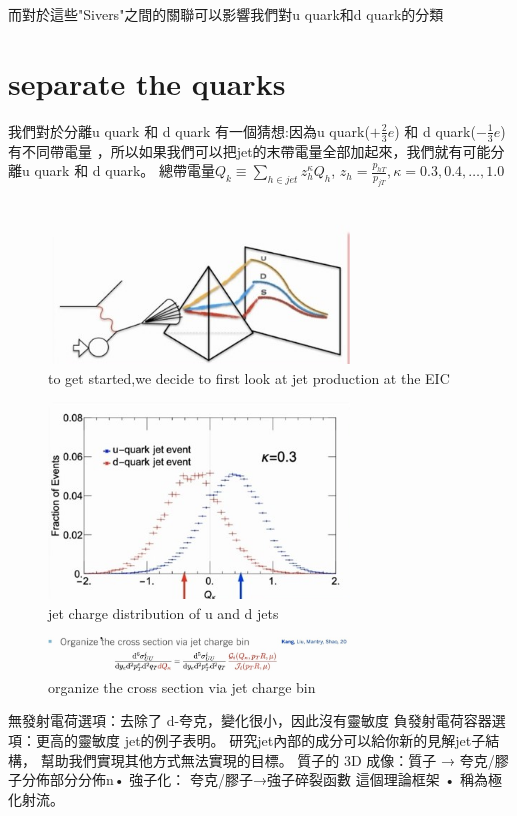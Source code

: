 \documentclass[12pt, a4paper, oneside]{ctexart}
\begin{document}
\begin{spacing}{2.0}
而對於這些"Sivers"之間的關聯可以影響我們對u quark和d quark的分類

\section{separate the quarks}

我們對於分離u quark 和 d quark 有一個猜想:因為u quark($+\frac{2}{3}e$) 和 d quark($-\frac{1}{3}e$) 有不同帶電量
，所以如果我們可以把jet的末帶電量全部加起來，我們就有可能分離u quark 和 d quark。
總帶電量$Q_k \equiv \sum_{h\in jet}z^{\kappa}_hQ_h$, $z_h = \frac{p_{hT}}{p_{jT}},\kappa = 0.3,0.4,\dots,1.0$
\begin{figure}
    \centering
    \includegraphics[width=8cm]{gamma.jpg}
    \caption{to get started,we decide to first look at jet production at the EIC}    
\end{figure}
\begin{figure}
    \centering
    \includegraphics[width=8cm]{xi.jpg}
    \caption{jet charge distribution of u and d jets}    
\end{figure}
\begin{figure}
    \centering
    \includegraphics[width=8cm]{omega.jpg}
    \caption{organize the cross section via jet charge bin}    
\end{figure}
無發射電荷選項：去除了 d-夸克，變化很小，因此沒有靈敏度
負發射電荷容器選項：更高的靈敏度
jet的例子表明。 研究jet內部的成分可以給你新的見解jet子結構，
幫助我們實現其他方式無法實現的目標。 
 質子的 3D 成像：質子 → 夸克/膠子分佈部分分佈n• 強子化：
夸克/膠子→強子碎裂函數
這個理論框架 • 稱為極化射流。




\end{spacing}
\end{document}
